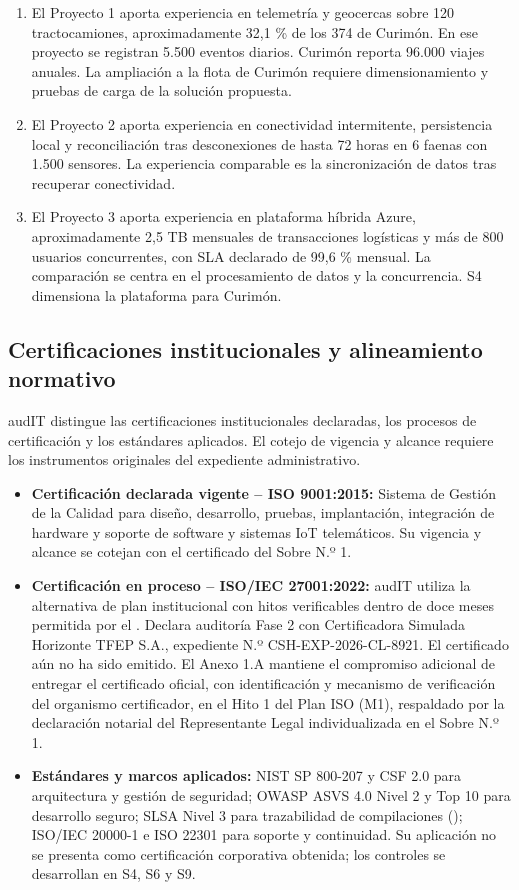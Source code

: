 \begin{enumerate}
  \item El Proyecto 1 aporta experiencia en telemetría y geocercas sobre 120 tractocamiones, aproximadamente 32,1 \% de los 374 de Curimón. En ese proyecto se registran 5.500 eventos diarios. Curimón reporta 96.000 viajes anuales. La ampliación a la flota de Curimón requiere dimensionamiento y pruebas de carga de la solución propuesta.
  \item El Proyecto 2 aporta experiencia en conectividad intermitente, persistencia local y reconciliación tras desconexiones de hasta 72 horas en 6 faenas con 1.500 sensores. La experiencia comparable es la sincronización de datos tras recuperar conectividad.
  \item El Proyecto 3 aporta experiencia en plataforma híbrida Azure, aproximadamente 2,5 TB mensuales de transacciones logísticas y más de 800 usuarios concurrentes, con SLA declarado de 99,6 \% mensual. La comparación se centra en el procesamiento de datos y la concurrencia. S4 dimensiona la plataforma para Curimón.
\end{enumerate}

\subsection{Certificaciones institucionales y alineamiento normativo}\label{sec:1-certificaciones}

audIT distingue las certificaciones institucionales declaradas, los procesos de certificación y los estándares aplicados. El cotejo de vigencia y alcance requiere los instrumentos originales del expediente administrativo.

\begin{itemize}
  \item \textbf{Certificación declarada vigente -- ISO 9001:2015:} Sistema de Gestión de la Calidad para diseño, desarrollo, pruebas, implantación, integración de hardware y soporte de software y sistemas IoT telemáticos. Su vigencia y alcance se cotejan con el certificado del Sobre N.º 1.
  \item \textbf{Certificación en proceso -- ISO/IEC 27001:2022:} audIT utiliza la alternativa de plan institucional con hitos verificables dentro de doce meses permitida por el . Declara auditoría Fase 2 con Certificadora Simulada Horizonte TFEP S.A., expediente N.º CSH-EXP-2026-CL-8921. El certificado aún no ha sido emitido. El Anexo 1.A mantiene el compromiso adicional de entregar el certificado oficial, con identificación y mecanismo de verificación del organismo certificador, en el Hito 1 del Plan ISO (M1), respaldado por la declaración notarial del Representante Legal individualizada en el Sobre N.º 1.
  \item \textbf{Estándares y marcos aplicados:} NIST SP 800-207 y CSF 2.0 para arquitectura y gestión de seguridad; OWASP ASVS 4.0 Nivel 2 y Top 10 para desarrollo seguro; SLSA Nivel 3 para trazabilidad de compilaciones (); ISO/IEC 20000-1 e ISO 22301 para soporte y continuidad. Su aplicación no se presenta como certificación corporativa obtenida; los controles se desarrollan en S4, S6 y S9.
\end{itemize}

